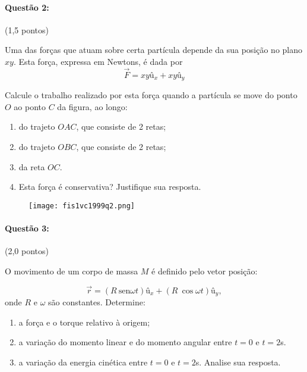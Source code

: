 \documentclass[12pt,a4paper]{article}
\newcommand{\sen}{\mathrm{sen}}
\begin{document}
\paragraph{Questão 2:} (1,5 pontos)

Uma das forças que atuam sobre certa partícula depende da sua posição no plano $xy$. Esta força, expressa em Newtons, é dada por
$$ \overrightarrow{F}=xy \textrm{û}_x + xy \textrm{û}_y$$

Calcule o trabalho realizado por esta força quando a partícula se move do ponto $O$ ao ponto $C$ da figura, ao longo:

\begin{enumerate}[label=\alph*)]
\item do trajeto $OAC$, que consiste de 2 retas;
\item do trajeto $OBC$, que consiste de 2 retas;
\item da reta $OC$.
\item Esta força é conservativa? Justifique sua resposta.
\end{enumerate}

\begin{figure}[ht]
\centering
\texttt{[image: fis1vc1999q2.png]}
\end{figure}

\paragraph{Questão 3:} (2,0 pontos)

O movimento de um corpo de massa $M$ é definido pelo vetor posição:

$$ \overrightarrow{r}= (R \ \sen \omega t)\textrm{û}_x +(R \ \cos\omega t) \textrm{û}_y, $$
onde $R$ e $\omega$ são constantes. Determine:

\begin{enumerate}[label=\alph*)]
\item a força e o torque relativo à origem;
\item a variação do momento linear e do momento angular entre $t=0$ e $t=2$s.
\item a variação da energia cinética entre $t=0$ e $t=2$s. Analise sua resposta.
\end{enumerate}
\end{document}
